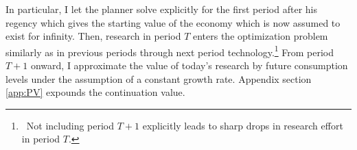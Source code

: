 In particular, I let the planner solve explicitly for the first period after his regency which gives the starting value of the economy which is now assumed to exist for infinity. 
Then, research in period $T$ enters the optimization problem similarly as in previous periods through next period technology.\footnote{\ Not including period $T+1$ explicitly leads to sharp drops in research effort in period $T$. }  From period $T+1$ onward, I approximate the value of today's research by future consumption levels under the assumption of a constant growth rate.  Appendix section \ref{app:PV} expounds  the continuation value.

